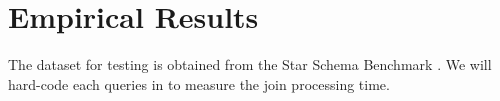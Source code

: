 \documentclass[10pt]{article}
\begin{document}
\section{Empirical Results}


The dataset for testing is obtained from the Star Schema Benchmark \cite{o2009star}. We will hard-code each queries in \cite{o2009star} to measure the join processing time.













\begin{comment}
\section{Deploying lookahead filters in distributed systems}

In this section we discuss a method to deploy the LIP filters in distributed systems. This method incorporates LIP and the \textsc{hypercube} algorithm \cite{zhu2017looking,}.


Let $p$ be the number of machines available. Let $k_i$ be the primary key of $D_i$, and each tuple in the fact table $F$ possesses a foreign key to each $D_i$. Suppose $p = \prod_{1 \leq i \leq n} p_i$,  and then we label each of the $p$ machines with a coordinate $(x_1, x_2, \dots, x_n)$ where each $1 \leq x_i \leq p_i$.

We first pick $n$ hash functions $h_i$ such that the range of each $h_i$ is $\{1, 2, \dots, p_i\}$. Then for each dimension table $D_i$ and for each primary key $k_i$ in $D_i$, we send $k_i$ to all machines with $i$-th component being $h_i(k_i)$. 

\end{comment}
\end{document}

